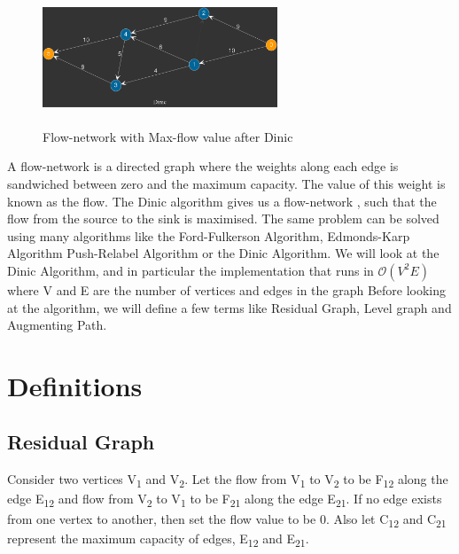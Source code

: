 \documentclass[paper=a4, fontsize=11pt]{scrartcl} %
\numberwithin{equation}{section} %
\numberwithin{figure}{section} %
\numberwithin{table}{section} %
\begin{document}
\begin{figure}[h]
\includegraphics[width=7cm, height=4cm,center]{p2.png}
\caption{Flow-network with Max-flow value after Dinic}
\label{fig:figure2}
\end{figure}

A flow-network is a directed graph where the weights along each edge is sandwiched between zero and the maximum capacity. The value of this weight is known as the flow. The Dinic algorithm gives us a flow-network , such that the flow from the source to the sink is maximised. The same problem can be solved using many algorithms like the Ford-Fulkerson Algorithm, Edmonds-Karp Algorithm Push-Relabel Algorithm or the Dinic Algorithm. We will look at the Dinic Algorithm, and in particular the implementation that runs in $\mathcal{O}(V^2E)$ where V and E are the number of vertices and edges in the graph  Before looking at the algorithm, we will define a few terms like Residual Graph, Level graph and Augmenting Path.





\section{Definitions}


\subsection{Residual Graph}

Consider two vertices V\textsubscript{1} and V\textsubscript{2}. Let the flow from V\textsubscript{1} to V\textsubscript{2} to be F\textsubscript{12} along the edge E\textsubscript{12} and flow from V\textsubscript{2} to V\textsubscript{1} to be F\textsubscript{21} along the edge E\textsubscript{21}. If no edge exists from one vertex to another, then set the flow value to be 0. Also let C\textsubscript{12} and C\textsubscript{21} represent the maximum capacity of edges, E\textsubscript{12} and E\textsubscript{21}.
\end{document}
